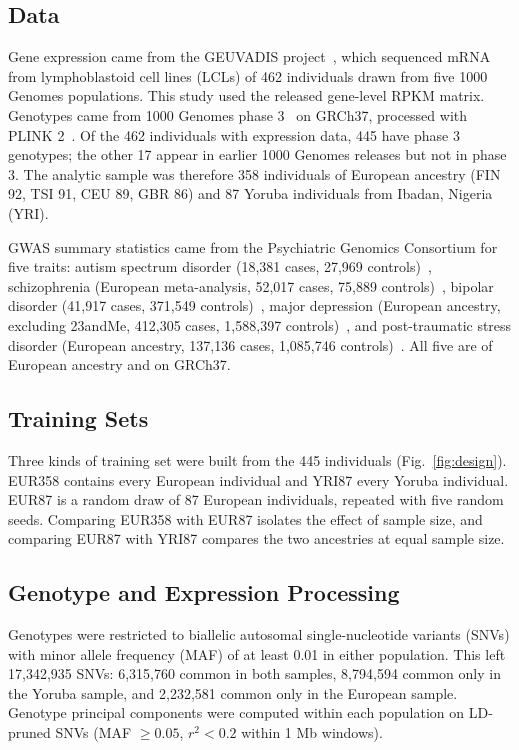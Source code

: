 \documentclass[conference]{IEEEtran}
\begin{document}
\subsection{Data}
Gene expression came from the GEUVADIS project~\cite{lappalainen2013}, which sequenced mRNA from lymphoblastoid cell lines (LCLs) of 462 individuals drawn from five 1000 Genomes populations. This study used the released gene-level RPKM matrix. Genotypes came from 1000 Genomes phase 3~\cite{kg2015} on GRCh37, processed with PLINK 2~\cite{chang2015}. Of the 462 individuals with expression data, 445 have phase 3 genotypes; the other 17 appear in earlier 1000 Genomes releases but not in phase 3. The analytic sample was therefore 358 individuals of European ancestry (FIN 92, TSI 91, CEU 89, GBR 86) and 87 Yoruba individuals from Ibadan, Nigeria (YRI).

GWAS summary statistics came from the Psychiatric Genomics Consortium for five traits: autism spectrum disorder (18,381 cases, 27,969 controls)~\cite{grove2019}, schizophrenia (European meta-analysis, 52,017 cases, 75,889 controls)~\cite{trubetskoy2022}, bipolar disorder (41,917 cases, 371,549 controls)~\cite{mullins2021}, major depression (European ancestry, excluding 23andMe, 412,305 cases, 1,588,397 controls)~\cite{adams2025}, and post-traumatic stress disorder (European ancestry, 137,136 cases, 1,085,746 controls)~\cite{nievergelt2024}. All five are of European ancestry and on GRCh37.

\subsection{Training Sets}
Three kinds of training set were built from the 445 individuals (Fig.~\ref{fig:design}). EUR358 contains every European individual and YRI87 every Yoruba individual. EUR87 is a random draw of 87 European individuals, repeated with five random seeds. Comparing EUR358 with EUR87 isolates the effect of sample size, and comparing EUR87 with YRI87 compares the two ancestries at equal sample size.

\subsection{Genotype and Expression Processing}
Genotypes were restricted to biallelic autosomal single-nucleotide variants (SNVs) with minor allele frequency (MAF) of at least 0.01 in either population. This left 17,342,935 SNVs: 6,315,760 common in both samples, 8,794,594 common only in the Yoruba sample, and 2,232,581 common only in the European sample. Genotype principal components were computed within each population on LD-pruned SNVs (MAF $\geq 0.05$, $r^2 < 0.2$ within 1 Mb windows).
\end{document}
